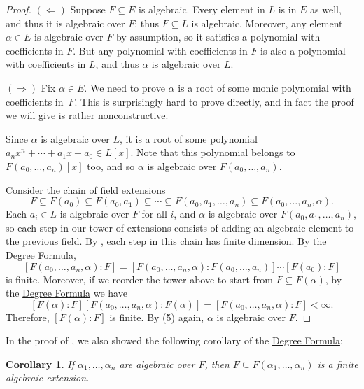 \documentclass[12pt]{report}
\newtheorem{corollary}[theorem]{Corollary}
\numberwithin{equation}{section}
\numberwithin{theorem}{chapter}
\theoremstyle{definition}
\newtheorem*{basic properties}{Basic Properties}
\newtheorem*{Important Remark}{Important Remark}
\begin{document}
\begin{proof}
$(\Leftarrow)$ Suppose $F \subseteq E$ is algebraic. Every element in $L$ is in $E$ as well, and thus it is algebraic over $F$; thus $F \subseteq L$ is algebraic. Moreover, any element $\alpha \in E$ is algebraic over $F$ by assumption, so it satisfies a polynomial with coefficients in $F$. But any polynomial with coefficients in $F$ is also a polynomial with coefficients in $L$, and thus $\alpha$ is algebraic over $L$.

$(\Rightarrow)$
Fix $\alpha \in E$. We need to prove $\alpha$ is a root of some monic polynomial with coefficients in~$F$. This is surprisingly hard to prove directly, and in fact the proof we will give is rather nonconstructive.

Since $\alpha$ is algebraic over $L$, it is a root of some polynomial $a_nx^n + \cdots + a_1 x + a_0 \in L[x]$. Note that this polynomial belongs to $F(a_0,\dots, a_{n})[x]$ too, and so $\alpha$ is algebraic over $F(a_0, \dots, a_{n})$.

Consider the chain of field extensions
$$F \subseteq F(a_0) \subseteq F(a_0,a_1) \subseteq \cdots \subseteq F(a_0, a_1, \ldots, a_{n} )\subseteq F(a_0, \ldots, a_{n}, \alpha).$$
Each $a_i \in L$ is algebraic over $F$ for all $i$, and $\alpha$ is algebraic over $F(a_0, a_1, \dots, a_{n})$, so each step in our tower of extensions consists of adding an algebraic element to the previous field. By , each step in this chain has finite dimension. By the \hyperref[deg formula]{Degree Formula},
$$[F(a_0, \ldots, a_{n}, \alpha): F] = [F(a_0, \ldots, a_{n}, \alpha): F(a_0, \ldots, a_{n})] \cdots [F(a_0): F]$$ 
is finite. Moreover, if we reorder the tower above to start from $F \subseteq F(\alpha)$, by the \hyperref[deg formula]{Degree Formula} we have
$$[F(\alpha):F] [F(a_0, \ldots, a_{n}, \alpha): F(\alpha)] = [F(a_0, \ldots, a_{n}, \alpha): F] < \infty.$$
Therefore, $[F(\alpha):F]$ is finite. By  (5) again, $\alpha$ is algebraic over $F$.
\end{proof}


In the proof of , we also showed the following corollary of the \hyperref[deg formula]{Degree Formula}:

\begin{corollary}\label{adjoining finitely many algebraic elements is finite}
	If $\alpha_1, \ldots, \alpha_n$ are algebraic over $F$, then $F \subseteq F(\alpha_1, \ldots, \alpha_n)$ is a finite algebraic extension.
\end{corollary}
\end{document}
